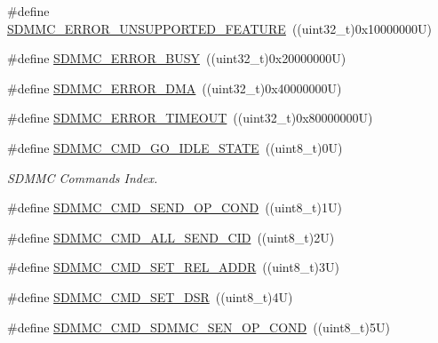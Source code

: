 \begin{DoxyCompactItemize}
\item 
\#define \mbox{\hyperlink{group___s_d_m_m_c___l_l___exported___constants_ga069b2ed51212ad872174262cc49a48e8}{S\+D\+M\+M\+C\+\_\+\+E\+R\+R\+O\+R\+\_\+\+U\+N\+S\+U\+P\+P\+O\+R\+T\+E\+D\+\_\+\+F\+E\+A\+T\+U\+RE}}~((uint32\+\_\+t)0x10000000\+U)
\item 
\#define \mbox{\hyperlink{group___s_d_m_m_c___l_l___exported___constants_gaaea1bf5ab746268b578c341c2de5dbe1}{S\+D\+M\+M\+C\+\_\+\+E\+R\+R\+O\+R\+\_\+\+B\+U\+SY}}~((uint32\+\_\+t)0x20000000\+U)
\item 
\#define \mbox{\hyperlink{group___s_d_m_m_c___l_l___exported___constants_ga2b572322b71e5f4c9002a88d25d0f61e}{S\+D\+M\+M\+C\+\_\+\+E\+R\+R\+O\+R\+\_\+\+D\+MA}}~((uint32\+\_\+t)0x40000000\+U)
\item 
\#define \mbox{\hyperlink{group___s_d_m_m_c___l_l___exported___constants_ga7adade4abd724bab3cc60349bef6732d}{S\+D\+M\+M\+C\+\_\+\+E\+R\+R\+O\+R\+\_\+\+T\+I\+M\+E\+O\+UT}}~((uint32\+\_\+t)0x80000000\+U)
\item 
\#define \mbox{\hyperlink{group___s_d_m_m_c___l_l___exported___constants_gae9eee968f102a4297c74c38cc854be15}{S\+D\+M\+M\+C\+\_\+\+C\+M\+D\+\_\+\+G\+O\+\_\+\+I\+D\+L\+E\+\_\+\+S\+T\+A\+TE}}~((uint8\+\_\+t)0\+U)
\begin{DoxyCompactList}\small\item\em S\+D\+M\+MC Commands Index. \end{DoxyCompactList}\item 
\#define \mbox{\hyperlink{group___s_d_m_m_c___l_l___exported___constants_gac0b20ae54c8d509d90bbe243935e7e28}{S\+D\+M\+M\+C\+\_\+\+C\+M\+D\+\_\+\+S\+E\+N\+D\+\_\+\+O\+P\+\_\+\+C\+O\+ND}}~((uint8\+\_\+t)1\+U)
\item 
\#define \mbox{\hyperlink{group___s_d_m_m_c___l_l___exported___constants_ga526986c457ca3dcb46639cec49d49a3d}{S\+D\+M\+M\+C\+\_\+\+C\+M\+D\+\_\+\+A\+L\+L\+\_\+\+S\+E\+N\+D\+\_\+\+C\+ID}}~((uint8\+\_\+t)2\+U)
\item 
\#define \mbox{\hyperlink{group___s_d_m_m_c___l_l___exported___constants_ga054fe3268291628a27c6deed1204eead}{S\+D\+M\+M\+C\+\_\+\+C\+M\+D\+\_\+\+S\+E\+T\+\_\+\+R\+E\+L\+\_\+\+A\+D\+DR}}~((uint8\+\_\+t)3\+U)
\item 
\#define \mbox{\hyperlink{group___s_d_m_m_c___l_l___exported___constants_gae9dc7575f43df542a8b093f4ab12b27b}{S\+D\+M\+M\+C\+\_\+\+C\+M\+D\+\_\+\+S\+E\+T\+\_\+\+D\+SR}}~((uint8\+\_\+t)4\+U)
\item 
\#define \mbox{\hyperlink{group___s_d_m_m_c___l_l___exported___constants_ga12aff9705a5fc55bb6a9bb442600967f}{S\+D\+M\+M\+C\+\_\+\+C\+M\+D\+\_\+\+S\+D\+M\+M\+C\+\_\+\+S\+E\+N\+\_\+\+O\+P\+\_\+\+C\+O\+ND}}~((uint8\+\_\+t)5\+U)

\end{DoxyCompactItemize}
